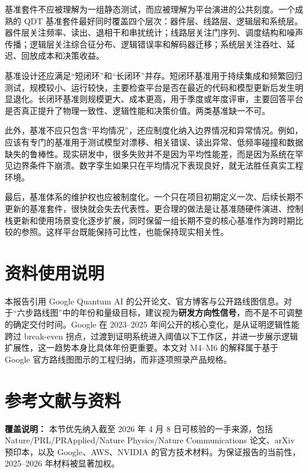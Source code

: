\documentclass[11pt,a4paper]{article}
\newcommand{\QDT}{QDT}
\begin{document}
基准套件不应被理解为一组静态测试，而应被理解为平台演进的公共刻度。一个成熟的 \QDT{} 基准套件最好同时覆盖四个层次：器件层、线路层、逻辑层和系统层。器件层关注频率、读出、退相干和串扰统计；线路层关注门序列、调度结构和噪声传播；逻辑层关注综合征分布、逻辑错误率和解码器迁移；系统层关注吞吐、延迟、回放成本和决策收益。

基准设计还应满足“短闭环”和“长闭环”并存。短闭环基准用于持续集成和频繁回归测试，规模较小、运行较快，主要检查平台是否在最近的代码和模型更新后发生明显退化。长闭环基准则规模更大、成本更高，用于季度或年度评审，主要回答平台是否真正提升了物理一致性、逻辑性能和决策价值。两类基准缺一不可。

此外，基准不应只包含“平均情况”，还应制度化纳入边界情况和异常情况。例如，应该有专门的基准用于测试模型对漂移、相关错误、读出异常、低频率碰撞和数据缺失的鲁棒性。现实研发中，很多失败并不是因为平均性能差，而是因为系统在罕见边界条件下崩溃。数字孪生如果只在平均情况下表现良好，就无法胜任真实工程环境。

最后，基准体系的维护权也应被制度化。一个只在项目初期定义一次、后续长期不更新的基准套件，很快就会失去代表性。更合理的做法是让基准随硬件演进、控制栈更新和使用场景变化逐步扩展，同时保留一组长期不变的核心基准作为跨时期比较的参照。这样平台既能保持可比性，也能保持现实相关性。

\section{资料使用说明}

本报告引用 Google Quantum AI 的公开论文、官方博客与公开路线图信息。对于“六步路线图”中的年份和量级目标，建议视为\textbf{研发方向性信号}，而不是不可调整的确定交付时间。Google 在 2023--2025 年间公开的核心变化，是从证明逻辑性能跨过 break-even 拐点，过渡到证明系统进入阈值以下工作区，并进一步展示逻辑扩展性，这一趋势本身比具体年份更重要。本文对 M4--M6 的解释属于基于 Google 官方路线图图示的工程归纳，而非逐项照录产品规格。

\section{参考文献与资料}

\noindent\textbf{覆盖说明：}
本节优先纳入截至 2026 年 4 月 8 日可核验的一手来源，包括 Nature/PRL/PRApplied/Nature Physics/Nature Communications 论文、arXiv 预印本，以及 Google、AWS、NVIDIA 的官方技术材料。为保证报告的当前性，2025--2026 年材料被显著加权。
\end{document}
